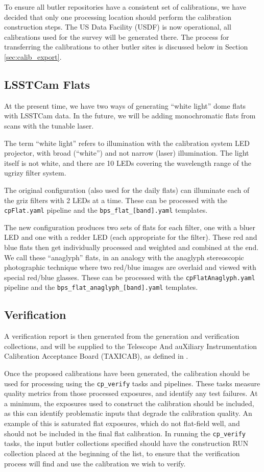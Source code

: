 \documentclass[DM,authoryear,toc]{lsstdoc}
\begin{document}
To ensure all butler repositories have a consistent set of calibrations, we have decided that only one processing location should perform the calibration construction steps.
The US Data Facility (USDF) is now operational, all calibrations used for the survey will be generated there.
The process for transferring the calibrations to other butler sites is discussed below in Section \ref{sec:calib_export}.

\subsection{LSSTCam Flats}

At the present time, we have two ways of generating ``white light'' dome flats with LSSTCam data.
In the future, we will be adding monochromatic flats from scans with the tunable laser.

The term ``white light'' refers to illumination with the calibration system LED projector, with broad (``white'') and not narrow (laser) illumination.
The light itself is not white, and there are 10 LEDs covering the wavelength range of the ugrizy filter system.

The original configuration (also used for the daily flats) can illuminate each of the griz filters with 2 LEDs at a time.
These can be processed with the \texttt{cpFlat.yaml} pipeline and the \texttt{bps\_flat\_[band].yaml} templates.

The new configuration produces two sets of flats for each filter, one with a bluer LED and one with a redder LED (each appropriate for the filter).
These red and blue flats then get individually processed and weighted and combined at the end.
We call these ``anaglyph'' flats, in an analogy with the anaglyph stereoscopic photographic technique where two red/blue images are overlaid and viewed with special red/blue glasses.
These can be processed with the \texttt{cpFlatAnaglyph.yaml} pipeline and the \texttt{bps\_flat\_anaglyph\_[band].yaml} templates.

\subsection{Verification}
A verification report is then generated from the generation and verification collections, and will be supplied to the Telescope And auXiliary Instrumentation Calibration Acceptance Board (TAXICAB), as defined in .

Once the proposed calibrations have been generated, the calibration should be used for processing using the \verb|cp_verify| tasks and pipelines.
These tasks measure quality metrics from those processed exposures, and identify any test failures.
At a minimum, the exposures used to construct the calibration should be included, as this can identify problematic inputs that degrade the calibration quality.
An example of this is saturated flat exposures, which do not flat-field well, and should not be included in the final flat calibration.
In running the \verb|cp_verify| tasks, the input butler collections specified should have the construction RUN collection placed at the beginning of the list, to ensure that the verification process will find and use the calibration we wish to verify.
\end{document}
